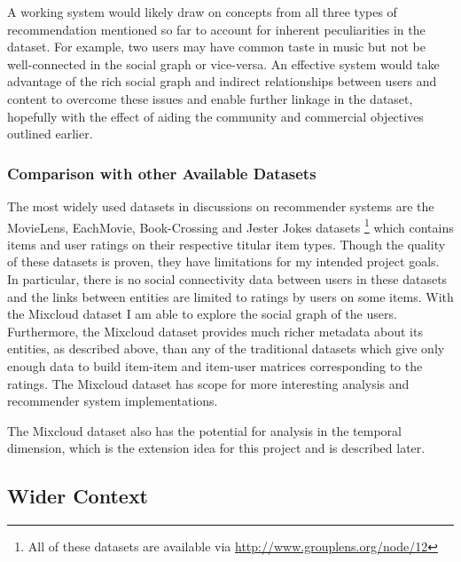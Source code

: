 A working system would likely draw on concepts from all three types of 
recommendation mentioned so far to account for inherent peculiarities in the 
dataset. For example, two users may have common taste in music but not be 
well-connected in the social graph or vice-versa. An effective system would 
take advantage of the rich social graph and indirect relationships between 
users and content to overcome these issues and enable further linkage in the 
dataset, hopefully with the effect of aiding the community and commercial 
objectives outlined earlier.

\subsubsection*{Comparison with other Available Datasets}

The most widely used datasets in discussions on recommender systems are the 
MovieLens, EachMovie, Book-Crossing and Jester Jokes datasets
\footnote{All of these datasets are available via 
\url{http://www.grouplens.org/node/12}} which contains items and user ratings 
on their respective titular item types. Though the quality of these datasets 
is proven, they have limitations for my intended project goals. In particular, 
there is no social connectivity data between users in these datasets and the 
links between entities are limited to ratings by users on some items. With the 
Mixcloud dataset I am able to explore the social graph of the users. 
Furthermore, the Mixcloud dataset provides much richer metadata about its 
entities, as described above, than any of the traditional datasets which give 
only enough data to build item-item and item-user matrices corresponding to the 
ratings. The Mixcloud dataset has scope for more interesting analysis and 
recommender system implementations.

The Mixcloud dataset also has the potential for analysis in the temporal 
dimension, which is the extension idea for this project and is described later.

\subsection*{Wider Context}

